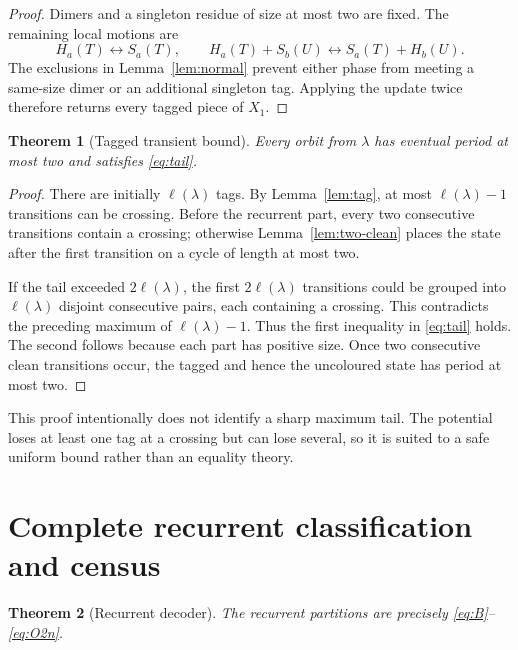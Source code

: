 \documentclass[10pt,a4paper]{amsart}
\newtheorem{theorem}{Theorem}[section]
\theoremstyle{definition}
\theoremstyle{remark}
\newcommand{\ellp}{\ell}
\begin{document}
\begin{proof}
Dimers and a singleton residue of size at most two are fixed.  The remaining
local motions are
\[
 H_a(T)\longleftrightarrow S_a(T),\qquad
 H_a(T)+S_b(U)\longleftrightarrow S_a(T)+H_b(U).
\]
The exclusions in Lemma~\ref{lem:normal} prevent either phase from meeting
a same-size dimer or an additional singleton tag.  Applying the update
twice therefore returns every tagged piece of $X_1$.
\end{proof}

\begin{theorem}[Tagged transient bound]\label{thm:tail}
Every orbit from $\lambda$ has eventual period at most two and satisfies
\eqref{eq:tail}.
\end{theorem}

\begin{proof}
There are initially $\ellp(\lambda)$ tags.  By
Lemma~\ref{lem:tag}, at most $\ellp(\lambda)-1$ transitions can be crossing.
Before the recurrent part, every two consecutive transitions contain a
crossing; otherwise Lemma~\ref{lem:two-clean} places the state after the
first transition on a cycle of length at most two.

If the tail exceeded $2\ellp(\lambda)$, the first
$2\ellp(\lambda)$ transitions could be grouped into
$\ellp(\lambda)$ disjoint consecutive pairs, each containing a crossing.
This contradicts the preceding maximum of $\ellp(\lambda)-1$.  Thus the
first inequality in \eqref{eq:tail} holds.  The second follows because each
part has positive size.  Once two consecutive clean transitions occur, the
tagged and hence the uncoloured state has period at most two.
\end{proof}

This proof intentionally does not identify a sharp maximum tail.  The
potential loses at least one tag at a crossing but can lose several, so it
is suited to a safe uniform bound rather than an equality theory.

\section{Complete recurrent classification and census}

\begin{theorem}[Recurrent decoder]\label{thm:recurrent}
The recurrent partitions are precisely
\eqref{eq:B}--\eqref{eq:O2n}.
\end{theorem}
\end{document}
